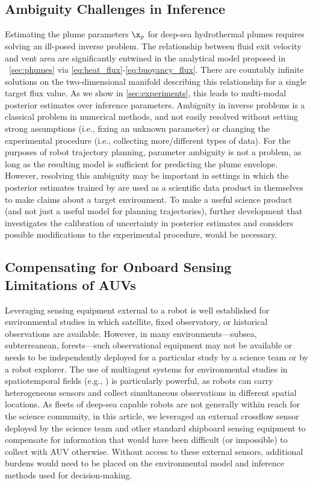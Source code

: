 \subsection{Ambiguity Challenges in Inference}
Estimating the plume parameters $\x_p$ for deep-sea hydrothermal plumes requires solving an ill-posed inverse problem. The relationship between fluid exit velocity and vent area are significantly entwined in the analytical model proposed in ~\cref{sec:phumes} via \cref{eq:heat_flux}-\cref{eq:buoyancy_flux}. There are countably infinite solutions on the two-dimensional manifold describing this relationship for a single target flux value. As we show in \cref{sec:experiments}, this leads to multi-modal posterior estimates over inference parameters. Ambiguity in inverse problems is a classical problem in numerical methods, and not easily resolved without setting strong assumptions (i.e., fixing an unknown parameter) or changing the experimental procedure (i.e., collecting more/different types of data). For the purposes of robot trajectory planning, parameter ambiguity is not a problem, as long as the resulting model is sufficient for predicting the plume envelope. However, resolving this ambiguity may be important in settings in which the posterior estimates trained by \PHUMES are used as a scientific data product in themselves to make claims about a target environment. To make \PHUMES a useful science product (and not just a useful model for planning trajectories), further development that investigates the calibration of uncertainty in posterior estimates and considers possible modifications to the experimental procedure, would be necessary. 

\subsection{Compensating for Onboard Sensing Limitations of AUVs}
Leveraging sensing equipment external to a robot is well established for environmental studies in which satellite, fixed observatory, or historical observations are available. However, in many environments---subsea, subterreanean, forests---such observational equipment may not be available or needs to be independently deployed for a particular study by a science team or by a robot explorer. The use of multiagent systems for environmental studies in spatiotemporal fields (e.g., \citealt{salam2019adaptive,li2014multi,luo2018adaptive,ouyang2014multi}) is particularly powerful, as robots can carry heterogeneous sensors and collect simultaneous observations in different spatial locations. As fleets of deep-sea capable robots are not generally within reach for the science community, in this article, we leveraged an external crossflow sensor deployed by the science team and other standard shipboard sensing equipment to compensate for information that would have been difficult (or impossible) to collect with AUV \Sentry otherwise. Without access to these external sensors, additional burdens would need to be placed on the environmental model and inference methods used for decision-making. 

